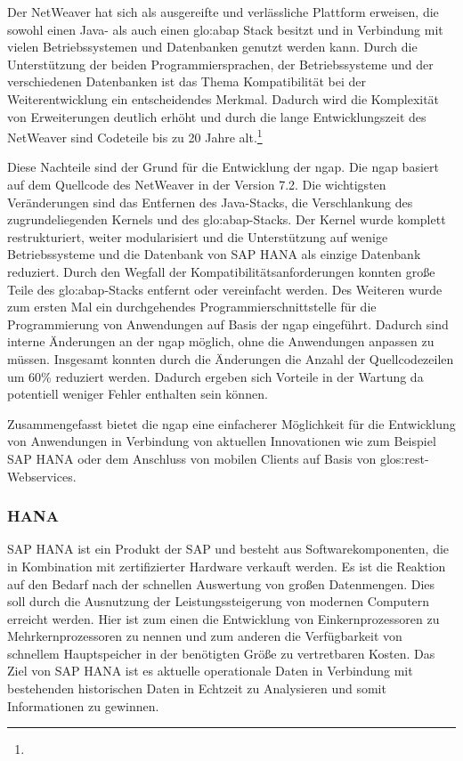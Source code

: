 \begin{onehalfspacing}
Der \gls{NetWeaver} hat sich als ausgereifte und verlässliche Plattform erweisen, die sowohl einen Java- als auch einen \gls{glo:abap} Stack besitzt und in Verbindung mit vielen Betriebssystemen und Datenbanken genutzt werden kann. Durch die Unterstützung der beiden Programmiersprachen, der Betriebssysteme und der verschiedenen Datenbanken ist das Thema Kompatibilität bei der Weiterentwicklung ein entscheidendes Merkmal. Dadurch wird die Komplexität von Erweiterungen deutlich erhöht und durch die lange Entwicklungszeit des \gls{NetWeaver} sind Codeteile bis zu 20 Jahre alt.\footnote{ }

Diese Nachteile sind der Grund für die Entwicklung der \gls{ngap}. Die \gls{ngap} basiert auf dem Quellcode des \gls{NetWeaver} in der Version 7.2. Die wichtigsten Veränderungen sind das Entfernen des Java-Stacks, die Verschlankung des zugrundeliegenden Kernels und des \gls{glo:abap}-Stacks. Der Kernel wurde komplett restrukturiert, weiter modularisiert und die Unterstützung auf wenige Betriebssysteme und die Datenbank von SAP HANA als einzige Datenbank reduziert. Durch den Wegfall der Kompatibilitätsanforderungen konnten große Teile des \gls{glo:abap}-Stacks entfernt oder vereinfacht werden. Des Weiteren wurde zum ersten Mal ein durchgehendes Programmierschnittstelle für die Programmierung von Anwendungen auf Basis der \gls{ngap} eingeführt. Dadurch sind interne Änderungen an der \gls{ngap} möglich, ohne die Anwendungen anpassen zu müssen. Insgesamt konnten durch die Änderungen die Anzahl der Quellcodezeilen um 60\% reduziert werden. Dadurch ergeben sich Vorteile in der Wartung da potentiell weniger Fehler enthalten sein können.

Zusammengefasst bietet die \gls{ngap} eine einfacherer Möglichkeit für die Entwicklung von Anwendungen in Verbindung von aktuellen Innovationen wie zum Beispiel SAP HANA oder dem Anschluss von mobilen Clients auf Basis von \gls{glos:rest}-Webservices.

\subsubsection{HANA}
SAP HANA ist ein Produkt der SAP und besteht aus Softwarekomponenten, die in Kombination mit zertifizierter Hardware verkauft werden. Es ist die Reaktion auf den Bedarf nach der schnellen Auswertung von großen Datenmengen. Dies soll durch die Ausnutzung der Leistungssteigerung von modernen Computern erreicht werden. Hier ist zum einen die Entwicklung von Einkernprozessoren zu Mehrkernprozessoren zu nennen und zum anderen die Verfügbarkeit von schnellem Hauptspeicher in der benötigten Größe zu vertretbaren Kosten. Das Ziel von SAP HANA ist es aktuelle operationale Daten in Verbindung mit bestehenden historischen Daten in Echtzeit zu Analysieren und somit Informationen zu gewinnen.


\end{onehalfspacing}
